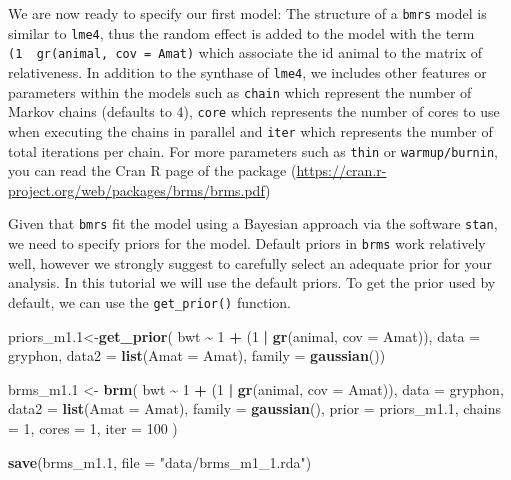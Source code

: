 \documentclass[
  12pt,
]{book}
\newenvironment{Shaded}{\begin{snugshade}}{\end{snugshade}}
\newcommand{\DataTypeTok}[1]{\textcolor[rgb]{0.13,0.29,0.53}{#1}}
\newcommand{\DecValTok}[1]{\textcolor[rgb]{0.00,0.00,0.81}{#1}}
\newcommand{\FloatTok}[1]{\textcolor[rgb]{0.00,0.00,0.81}{#1}}
\newcommand{\KeywordTok}[1]{\textcolor[rgb]{0.13,0.29,0.53}{\textbf{#1}}}
\newcommand{\NormalTok}[1]{#1}
\newcommand{\OperatorTok}[1]{\textcolor[rgb]{0.81,0.36,0.00}{\textbf{#1}}}
\newcommand{\StringTok}[1]{\textcolor[rgb]{0.31,0.60,0.02}{#1}}
\begin{document}
We are now ready to specify our first model:
The structure of a \texttt{bmrs} model is similar to \texttt{lme4}, thus the random effect is added to the model with the term \texttt{(1\ \textbar{}\ gr(animal,\ cov\ =\ Amat)} which associate the id animal to the matrix of relativeness.
In addition to the synthase of \texttt{lme4}, we includes other features or parameters within the models such as \texttt{chain} which represent the number of Markov chains (defaults to 4), \texttt{core} which represents the number of cores to use when executing the chains in parallel and \texttt{iter} which represents the number of total iterations per chain. For more parameters such as \texttt{thin} or \texttt{warmup/burnin}, you can read the Cran R page of the package (\url{https://cran.r-project.org/web/packages/brms/brms.pdf})

Given that \texttt{bmrs} fit the model using a Bayesian approach via the software \texttt{stan}, we need to specify priors for the model.
Default priors in \texttt{brms} work relatively well, however we strongly suggest to carefully select an adequate prior for your analysis.
In this tutorial we will use the default priors.
To get the prior used by default, we can use the \texttt{get\_prior()} function.

\begin{Shaded}
\begin{Highlighting}[]
\NormalTok{priors\_m1}\FloatTok{.1}\NormalTok{\textless{}{-}}\KeywordTok{get\_prior}\NormalTok{( bwt }\OperatorTok{\textasciitilde{}}\StringTok{ }\DecValTok{1} \OperatorTok{+}\StringTok{ }\NormalTok{(}\DecValTok{1} \OperatorTok{|}\StringTok{ }\KeywordTok{gr}\NormalTok{(animal, }\DataTypeTok{cov =}\NormalTok{ Amat)),}
  \DataTypeTok{data =}\NormalTok{ gryphon,}
  \DataTypeTok{data2 =} \KeywordTok{list}\NormalTok{(}\DataTypeTok{Amat =}\NormalTok{ Amat),}
  \DataTypeTok{family =} \KeywordTok{gaussian}\NormalTok{())  }
  
\NormalTok{brms\_m1}\FloatTok{.1}\NormalTok{ \textless{}{-}}\StringTok{ }\KeywordTok{brm}\NormalTok{(}
\NormalTok{  bwt }\OperatorTok{\textasciitilde{}}\StringTok{ }\DecValTok{1} \OperatorTok{+}\StringTok{ }\NormalTok{(}\DecValTok{1} \OperatorTok{|}\StringTok{ }\KeywordTok{gr}\NormalTok{(animal, }\DataTypeTok{cov =}\NormalTok{ Amat)),}
  \DataTypeTok{data =}\NormalTok{ gryphon,}
  \DataTypeTok{data2 =} \KeywordTok{list}\NormalTok{(}\DataTypeTok{Amat =}\NormalTok{ Amat),}
  \DataTypeTok{family =} \KeywordTok{gaussian}\NormalTok{(),}
  \DataTypeTok{prior =}\NormalTok{ priors\_m1}\FloatTok{.1}\NormalTok{,}
  \DataTypeTok{chains =} \DecValTok{1}\NormalTok{, }\DataTypeTok{cores =} \DecValTok{1}\NormalTok{, }\DataTypeTok{iter =} \DecValTok{100}
\NormalTok{)}

\KeywordTok{save}\NormalTok{(brms\_m1}\FloatTok{.1}\NormalTok{, }\DataTypeTok{file =} \StringTok{"data/brms\_m1\_1.rda"}\NormalTok{)}
\end{Highlighting}
\end{Shaded}
\end{document}

